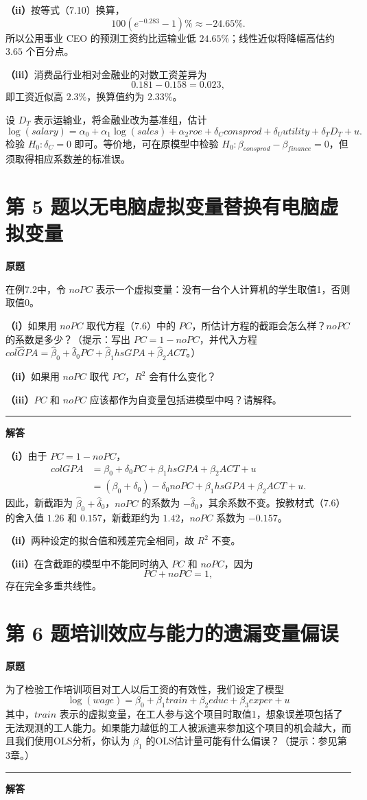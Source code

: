 \documentclass[UTF8,a4paper,11pt,fontset=fandol]{ctexart}
\newcommand{\vr}[1]{\mathit{#1}}
\newcommand{\subq}[1]{\par\medskip\noindent\textbf{（#1）}\enspace}
\newcommand{\question}[2]{\def\currentquestiontitle{第 #1 题\quad #2}}
\newenvironment{originalquestion}{%
  \par\medskip\noindent\begin{minipage}{\linewidth}
  \section*{\currentquestiontitle}
  \par\smallskip\noindent\textbf{原题}\par\smallskip
  \begingroup\small\setlength{\parskip}{2.5pt}%
}{%
  \par\endgroup\end{minipage}\par\medskip\Needspace{6\baselineskip}
  \noindent\rule{\linewidth}{0.35pt}\par\smallskip
  \noindent\textbf{解答}\par
}
\begin{document}
\subq{ii}按等式（7.10）换算，
\[
100(e^{-0.283}-1)\%\approx\boxed{-24.65\%}.
\]
所以公用事业 CEO 的预测工资约比运输业低 $24.65\%$；线性近似将降幅高估约 $3.65$ 个百分点。

\subq{iii}消费品行业相对金融业的对数工资差异为
\[
0.181-0.158=0.023,
\]
即工资近似高 $2.3\%$，换算值约为 $2.33\%$。

设 $D_T$ 表示运输业，将金融业改为基准组，估计
\[
\log(\vr{salary})=\alpha_0+\alpha_1\log(\vr{sales})+\alpha_2\vr{roe}
+\delta_C\vr{consprod}+\delta_U\vr{utility}+\delta_TD_T+u.
\]
检验 $H_0:\delta_C=0$ 即可。等价地，可在原模型中检验
$H_0:\beta_{\vr{consprod}}-\beta_{\vr{finance}}=0$，但须取得相应系数差的标准误。

\question{5}{以无电脑虚拟变量替换有电脑虚拟变量}
\begin{originalquestion}
在例7.2中，令 $\vr{noPC}$ 表示一个虚拟变量：没有一台个人计算机的学生取值1，否则取值0。

\subq{i}如果用 $\vr{noPC}$ 取代方程（7.6）中的 $\vr{PC}$，所估计方程的截距会怎么样？$\vr{noPC}$ 的系数是多少？（提示：写出 $\vr{PC}=1-\vr{noPC}$，并代入方程 $\widehat{\vr{colGPA}}=\widehat\beta_0+\widehat\delta_0\vr{PC}+\widehat\beta_1\vr{hsGPA}+\widehat\beta_2\vr{ACT}$。）

\subq{ii}如果用 $\vr{noPC}$ 取代 $\vr{PC}$，$R^2$ 会有什么变化？

\subq{iii}$\vr{PC}$ 和 $\vr{noPC}$ 应该都作为自变量包括进模型中吗？请解释。
\end{originalquestion}

\subq{i}由于 $\vr{PC}=1-\vr{noPC}$，
\[
\begin{aligned}
\vr{colGPA}
&=\beta_0+\delta_0\vr{PC}+\beta_1\vr{hsGPA}+\beta_2\vr{ACT}+u\\
&=(\beta_0+\delta_0)-\delta_0\vr{noPC}
+\beta_1\vr{hsGPA}+\beta_2\vr{ACT}+u.
\end{aligned}
\]
因此，新截距为 $\widehat\beta_0+\widehat\delta_0$，$\vr{noPC}$ 的系数为 $-\widehat\delta_0$，其余系数不变。按教材式（7.6）的舍入值 $1.26$ 和 $0.157$，新截距约为 $1.42$，$\vr{noPC}$ 系数为 $-0.157$。

\subq{ii}两种设定的拟合值和残差完全相同，故 $R^2$ 不变。

\subq{iii}在含截距的模型中不能同时纳入 $\vr{PC}$ 和 $\vr{noPC}$，因为
\[
\vr{PC}+\vr{noPC}=1,
\]
存在完全多重共线性。

\question{6}{培训效应与能力的遗漏变量偏误}
\begin{originalquestion}
为了检验工作培训项目对工人以后工资的有效性，我们设定了模型
\[
\log(\vr{wage})=\beta_0+\beta_1\vr{train}+\beta_2\vr{educ}+\beta_3\vr{exper}+u
\]
其中，$\vr{train}$ 表示的虚拟变量，在工人参与这个项目时取值1，想象误差项包括了无法观测的工人能力。如果能力越低的工人被派遣来参加这个项目的机会越大，而且我们使用OLS分析，你认为 $\beta_1$ 的OLS估计量可能有什么偏误？（提示：参见第3章。）
\end{originalquestion}
\end{document}
